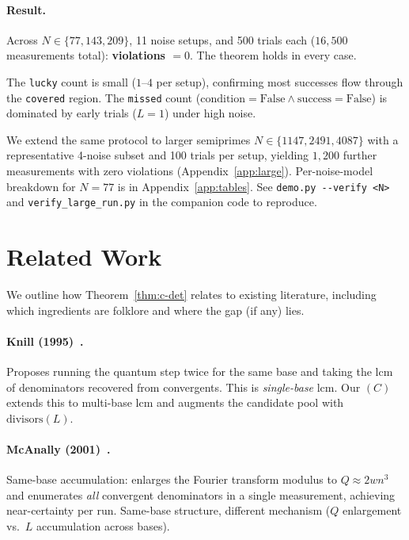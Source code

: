 \documentclass[11pt]{article}
\begin{document}
\paragraph{Result.}
Across $N \in \{77, 143, 209\}$, 11 noise setups, and 500 trials each ($16{,}500$ measurements total): \textbf{violations $= 0$}. The theorem holds in every case.

The \texttt{lucky} count is small ($1$--$4$ per setup), confirming most successes flow through the \texttt{covered} region. The \texttt{missed} count ($\mathrm{condition} = \text{False} \land \mathrm{success} = \text{False}$) is dominated by early trials ($L = 1$) under high noise.

We extend the same protocol to larger semiprimes $N \in \{1147, 2491, 4087\}$ with a representative 4-noise subset and 100 trials per setup, yielding $1{,}200$ further measurements with zero violations (Appendix~\ref{app:large}). Per-noise-model breakdown for $N = 77$ is in Appendix~\ref{app:tables}. See \texttt{demo.py -{}-verify <N>} and \texttt{verify\_large\_run.py} in the companion code to reproduce.

\section{Related Work}
\label{sec:related}

We outline how Theorem~\ref{thm:c-det} relates to existing literature, including which ingredients are folklore and where the gap (if any) lies.

\paragraph{Knill (1995)~\cite{knill1995}.}
Proposes running the quantum step twice for the same base and taking the lcm of denominators recovered from convergents. This is \emph{single-base} lcm. Our $(C)$ extends this to multi-base lcm and augments the candidate pool with $\mathrm{divisors}(L)$.

\paragraph{McAnally (2001)~\cite{mcanally2001}.}
Same-base accumulation: enlarges the Fourier transform modulus to $Q \approx 2 w n^3$ and enumerates \emph{all} convergent denominators in a single measurement, achieving near-certainty per run. Same-base structure, different mechanism ($Q$ enlargement vs.\ $L$ accumulation across bases).
\end{document}
